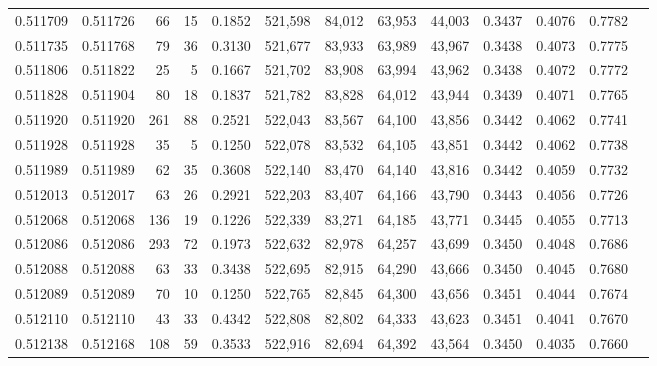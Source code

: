 \begin{tabular}{rrrrrrrrrrrrr}
0.511709 & 0.511726 &    66 &    15 &                                     0.1852 & 521,598 &  84,012 &  63,953 &  44,003 & 0.3437 & 0.4076 & 0.7782 \\
0.511735 & 0.511768 &    79 &    36 &                                     0.3130 & 521,677 &  83,933 &  63,989 &  43,967 & 0.3438 & 0.4073 & 0.7775 \\
0.511806 & 0.511822 &    25 &     5 &                                     0.1667 & 521,702 &  83,908 &  63,994 &  43,962 & 0.3438 & 0.4072 & 0.7772 \\
0.511828 & 0.511904 &    80 &    18 &                                     0.1837 & 521,782 &  83,828 &  64,012 &  43,944 & 0.3439 & 0.4071 & 0.7765 \\
0.511920 & 0.511920 &   261 &    88 &                                     0.2521 & 522,043 &  83,567 &  64,100 &  43,856 & 0.3442 & 0.4062 & 0.7741 \\
0.511928 & 0.511928 &    35 &     5 &                                     0.1250 & 522,078 &  83,532 &  64,105 &  43,851 & 0.3442 & 0.4062 & 0.7738 \\
0.511989 & 0.511989 &    62 &    35 &                                     0.3608 & 522,140 &  83,470 &  64,140 &  43,816 & 0.3442 & 0.4059 & 0.7732 \\
0.512013 & 0.512017 &    63 &    26 &                                     0.2921 & 522,203 &  83,407 &  64,166 &  43,790 & 0.3443 & 0.4056 & 0.7726 \\
0.512068 & 0.512068 &   136 &    19 &                                     0.1226 & 522,339 &  83,271 &  64,185 &  43,771 & 0.3445 & 0.4055 & 0.7713 \\
0.512086 & 0.512086 &   293 &    72 &                                     0.1973 & 522,632 &  82,978 &  64,257 &  43,699 & 0.3450 & 0.4048 & 0.7686 \\
0.512088 & 0.512088 &    63 &    33 &                                     0.3438 & 522,695 &  82,915 &  64,290 &  43,666 & 0.3450 & 0.4045 & 0.7680 \\
0.512089 & 0.512089 &    70 &    10 &                                     0.1250 & 522,765 &  82,845 &  64,300 &  43,656 & 0.3451 & 0.4044 & 0.7674 \\
0.512110 & 0.512110 &    43 &    33 &                                     0.4342 & 522,808 &  82,802 &  64,333 &  43,623 & 0.3451 & 0.4041 & 0.7670 \\
0.512138 & 0.512168 &   108 &    59 &                                     0.3533 & 522,916 &  82,694 &  64,392 &  43,564 & 0.3450 & 0.4035 & 0.7660 \\

\end{tabular}
